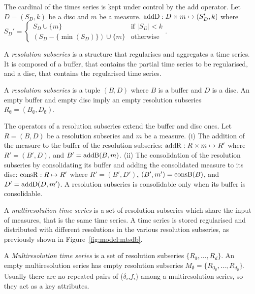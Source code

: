 The cardinal of the times series is kept under control by the add
operator. Let $D=(S_D,k)$ be a disc and $m$ be a measure. $\operatorname{addD} : D\times m\mapsto (S'_D,k)$ where %
$
 S_D' = \begin{cases}
  S_D\cup\{m\}                 & \text{if } |S_D|<k  \\
  (S_D-\{\min(S_D)\}) \cup \{m\} & \text{otherwise}
\end{cases}  
$.


A \emph{resolution subseries} is a structure that regularises and
aggregates a time series. It is composed of a buffer, that contains
the partial time series to be regularised, and a disc, that contains
the regularised time series.
\begin{definition}%
  A \emph{resolution subseries} is a tuple $(B,D)$ where $B$ is a
  buffer and $D$ is a disc.  An empty buffer and empty disc imply an
  empty resolution subseries $R_{\emptyset} =
  (B_{\emptyset},D_{\emptyset})$.
\end{definition}
 
The operators of a resolution subseries extend the buffer and disc
ones. Let $R=(B,D)$ be a resolution subseries and $m$ be a measure.
(i) The addition of the measure to the buffer of the resolution
subseries: $\operatorname{addR} : R \times m \mapsto R'$ where $R'= (B',D)$,
and $B'= \operatorname{addB}(B,m)$. (ii) The consolidation of the resolution
subseries by consolidating its buffer and adding the consolidated
measure to its disc: $\operatorname{consR} : R \mapsto R'$ where $R'=
(B',D')$, $(B',m') = \operatorname{consB}(B)$, and $D'= \operatorname{addD}(D,m')$.  A resolution
subseries is consolidable only when its buffer is consolidable.




A \emph{multiresolution time series} is a set of resolution subseries
which share the input of measures, that is the same time series. A
time series is stored regularised and distributed with different
resolutions in the various resolution subseries, as previously shown
in Figure~\ref{fig:model:mtsdb}.
\begin{definition}%
  A \emph{Mul\-ti\-re\-solution time series} is a set of resolution
  subseries $\{R_0, \dots, R_d\}$.  An empty multiresolution series
  has empty resolution subseries $M_{\emptyset}=\{R_{0_\emptyset},
  \dots, R_{d_\emptyset}\}$. Usually there are no repeated pairs of
  ($\delta_i$,$f_i$) among a multiresolution series, so they act as a
  key attributes.
\end{definition}

